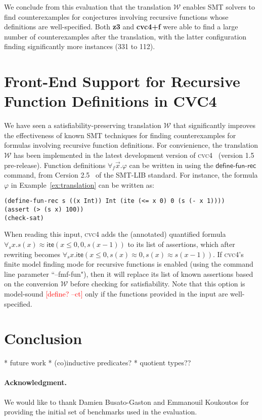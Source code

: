 \documentclass[runningheads,a4paper]{llncs}
\newcommand{\con}[1]{\mathsf{#1}}
\newcommand{\cvc}{\textsc{cvc}{\small 4}\xspace}
\newcommand{\teq}{\approx}
\newcommand{\conv}{\mathcal{W}}
\newcommand{\lite}{\con{ite}}
\newcommand{\forallf}[1]{\forall_{#1}}
\newcommand{\rem}[1]{\textcolor{red}{[#1]}}
\newcommand{\ct}[1]{\rem{#1 --ct}}
\newcommand{\definefunreccmd}{\con{define}\text{-}\con{fun}\text{-}\con{rec}}
\begin{document}
We conclude from this evaluation that the translation $\conv$ enables SMT solvers to find counterexamples 
for conjectures involving recursive functions whose definitions are well-specified.
Both {\bf z3} and {\bf cvc4+f} were able to find a large number of counterexamples after the translation,
with the latter configuration finding significantly more instances (331 to 112).

\section{Front-End Support for Recursive Function Definitions in CVC4}
\label{sec:front-end}

We have seen a satisfiability-preserving translation $\conv$ that significantly improves the effectiveness of known SMT techniques
for finding counterexamples for formulas involving recursive function definitions.
For convienience, the translation $\conv$ has been implemented in the latest development version of \cvc~\cite{ReyEtAl-1-RR-13} (version 1.5 pre-release).
Function definitions $\forallf{f} \vec x. \varphi$ can be written in using the $\definefunreccmd$ command, 
from Cersion 2.5~\cite{} of the SMT-LIB standard.
For instance, the formula $\varphi$ in Example~\ref{ex:translation} 
can be written as:

{\small
\begin{verbatim}
(define-fun-rec s ((x Int)) Int (ite (<= x 0) 0 (s (- x 1))))
(assert (> (s x) 100))
(check-sat)
\end{verbatim}
}

When reading this input, 
\cvc adds the (annotated) quantified formula $\forallf{s} x. s( x ) \teq \lite( x \leq 0, 0, s( x-1 ) )$ to its list of assertions,
which after rewriting becomes $\forallf{s} x. \lite( x \leq 0, s( x ) \teq 0, s( x ) \teq s( x-1 ) )$.
If \cvc's finite model finding mode for recursive functions is enabled (using the command line parameter ``--fmf-fun"),
then it will replace its list of known assertions based on the conversion $\conv$ before checking for satisfiability.
Note that this option is model-sound \ct{define?} only if the functions provided in the input are well-specified.

\section{Conclusion}
\label{sec:conclusion}

  * future work
    * (co)inductive predicates?
    * quotient types??

{%
\def\ackname{Acknowledgment}
\paragraph{%
\ackname.}
We would like to thank Damien Busato-Gaston and Emmanouil Koukoutos for providing the initial set of benchmarks used in the evaluation.
}



{


}
\end{document}
